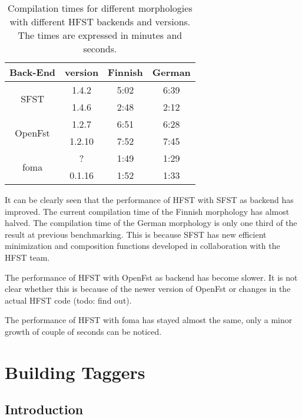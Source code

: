 \documentclass{llncs}
\begin{document}
\begin{table}
  \caption{Compilation times for different morphologies with
    different HFST backends and versions. 
    The times are expressed in minutes and seconds.}
  \label{tab:compilation_times_versions}
  \begin{tabular}{ c  c  c  c }
\hline
  Back-End                 & version  & Finnish  & German \\ \hline
  \multirow{2}{*}{SFST}    & 1.4.2    & 5:02     & 6:39 \\
                           & 1.4.6    & 2:48     & 2:12 \\ \hline
  \multirow{2}{*}{OpenFst} & 1.2.7    & 6:51     & 6:28 \\
                           & 1.2.10   & 7:52     & 7:45 \\ \hline
  \multirow{2}{*}{foma}    & ?        & 1:49     & 1:29 \\
                           & 0.1.16   & 1:52     & 1:33 \\
\hline
  \end{tabular}

\end{table}

It can be clearly seen that the performance of HFST with SFST as backend 
has improved. The current compilation time of the Finnish morphology has almost
halved. The compilation time of the German morphology is only one third of the
result at previous benchmarking. 
This is because SFST has new efficient minimization and composition functions
developed in collaboration with the HFST team.

The performance of HFST with OpenFst as backend has become slower. It is not
clear whether this is because of the newer version of OpenFst or changes in the 
actual HFST code (todo: find out).

The performance of HFST with foma has stayed almost the same, only a minor
growth of couple of seconds can be noticed. 
 

\section{Building Taggers}

\subsection{Introduction}
\end{document}
